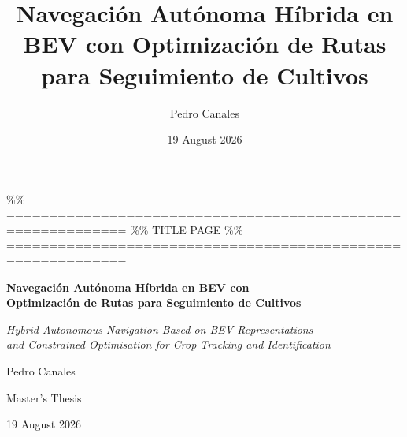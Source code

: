 \documentclass[12pt, a4paper]{article}
\title{Navegación Autónoma Híbrida en BEV con Optimización de Rutas para Seguimiento de Cultivos}
\author{Pedro Canales}
\date{19 August 2026}
\begin{document}
\maketitle
\tableofcontents
\newpage

\%\% ============================================================
\%\% TITLE PAGE
\%\% ============================================================
\begin{titlepage}
\centering
\vspace*{2.5cm}

{\LARGE\bfseries Navegación Autónoma Híbrida en BEV con\\[6pt]
Optimización de Rutas para Seguimiento de Cultivos\par}

\vspace{0.9cm}
{\large\itshape Hybrid Autonomous Navigation Based on BEV Representations\\[3pt]
and Constrained Optimisation for Crop Tracking and Identification\par}

\vspace{2.8cm}
{\large Pedro Canales\par}

\vspace{1.5cm}
{\normalsize Master's Thesis\par}
\vspace{0.4cm}
{\normalsize 19 August 2026\par}

\vfill
\end{titlepage}
\end{document}
